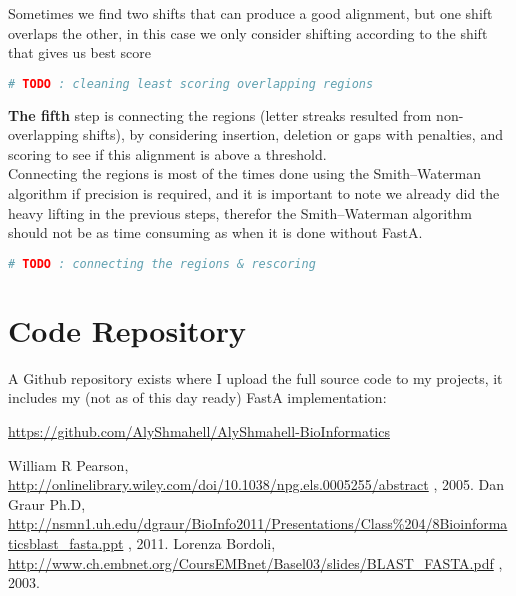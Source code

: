 \documentclass[12pt]{report}
\begin{document}
Sometimes we find two shifts that can produce a good alignment, but one shift overlaps the other, in this case we only consider shifting according to the shift that gives us best score\\
\begin{lstlisting}[language=Python]
			# TODO : cleaning least scoring overlapping regions
\end{lstlisting}
\textbf{The fifth} step is connecting the regions (letter streaks resulted from non-overlapping shifts), by considering insertion, deletion or gaps with penalties, and scoring to see if this alignment is above a threshold.\\
Connecting the regions is most of the times done using the Smith–Waterman algorithm if precision is required, and it is important to note we already did the heavy lifting in the previous steps, therefor the Smith–Waterman algorithm should not be as time consuming as when it is done without FastA.
\begin{lstlisting}[language=Python]
			# TODO : connecting the regions & rescoring
\end{lstlisting}
\newpage
\section{\textbf{Code Repository}}
A Github repository exists where I upload the full source code to my projects, it includes my (not as of this day ready) FastA implementation:\\
\begin{center}
	\url{https://github.com/AlyShmahell/AlyShmahell-BioInformatics}
\end{center}
  \begin{thebibliography}{1}
  	 William R Pearson, 
  	\url{http://onlinelibrary.wiley.com/doi/10.1038/npg.els.0005255/abstract} , 2005.
  	 Dan Graur Ph.D, 
  	\url{http://nsmn1.uh.edu/dgraur/BioInfo2011/Presentations/Class\%204/8Bioinformaticsblast_fasta.ppt} , 2011.
  	 Lorenza Bordoli, 
  	\url{http://www.ch.embnet.org/CoursEMBnet/Basel03/slides/BLAST_FASTA.pdf} , 2003.
  \end{thebibliography}
\end{document}
